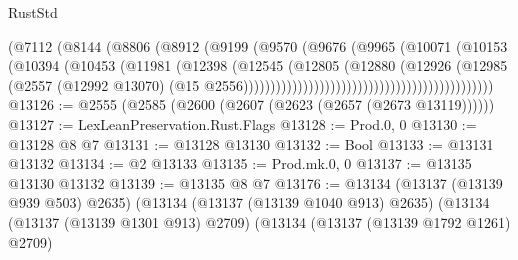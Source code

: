 \begin{lexlean}{RustStd}
\begin{coremodule}
                                                      (@7112
                                                        (@8144
                                                          (@8806
                                                            (@8912
                                                              (@9199
                                                                (@9570
                                                                  (@9676
                                                                    (@9965
                                                                      (@10071
                                                                        (@10153
                                                                          (@10394
                                                                            (@10453
                                                                              (@11981
                                                                                (@12398
                                                                                  (@12545
                                                                                    (@12805
                                                                                      (@12880
                                                                                        (@12926
                                                                                          (@12985
                                                                                            (@2557
                                                                                              (@12992
                                                                                                @13070)
                                                                                              (@15
                                                                                                @2556))))))))))))))))))))))))))))))))))))))))))))))
@13126 := @2555 (@2585 (@2600 (@2607 (@2623 (@2657 (@2673 @13119))))))
@13127 := LexLeanPreservation.Rust.Flags
@13128 := Prod.{0, 0}
@13130 := @13128 @8 @7
@13131 := @13128 @13130
@13132 := Bool
@13133 := @13131 @13132
@13134 := @2 @13133
@13135 := Prod.mk.{0, 0}
@13137 := @13135 @13130 @13132
@13139 := @13135 @8 @7
@13176 := @13134
    (@13137 (@13139 @939 @503) @2635)
    (@13134
      (@13137 (@13139 @1040 @913) @2635)
      (@13134
        (@13137 (@13139 @1301 @913) @2709)
        (@13134
          (@13137 (@13139 @1792 @1261) @2709)

\end{coremodule}
\end{lexlean}
